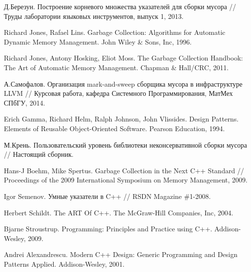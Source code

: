 \begin{thebibliography}{9001}

 Д.Березун. Построение корневого множества указателей для сборки мусора
// Труды лаборатории языковых инструментов, выпуск 1, 2013.

 Richard Jones, Rafael Lins. Garbage Collection: Algorithms for Automatic Dynamic Memory Management.
John Wiley \& Sons, Inc, 1996.

 Richard Jones, Antony Hosking, Eliot Moss. The Garbage Collection Handbook: The Art of Automatic Memory Management. Chapman \& Hall/CRC, 2011.

 А.Самофалов. Организация mark-and-sweep сборщика мусора в инфраструктуре LLVM //
Курсовая работа, кафедра Системного Программирования, МатМех СПбГУ, 2014.

 Erich Gamma, Richard Helm, Ralph Johnson, John Vlissides. Design Patterns. Elements of Reusable Object-Oriented Software. Pearson Education, 1994.

 М.Крень. Пользовательский уровень библиотеки неконсервативной сборки мусора //
Настоящий сборник.

 Hans-J Boehm, Mike Spertus. Garbage Collection in the Next C++ Standard //
Proceedings of the 2009 International Symposium on Memory Management, 2009.

 Igor Semenov. Умные указатели в C++ // RSDN Magazine \#1-2008.

 Herbert Schildt. The ART Of C++. The McGraw-Hill Companies, Inc, 2004.

 Bjarne Stroustrup. Programming: Principles and Practice using C++. Addison-Wesley, 2009.

 Andrei Alexandrescu. Modern C++ Design: Generic Programming and Design Patterns Applied. Addison-Wesley, 2001.
\end{thebibliography}

